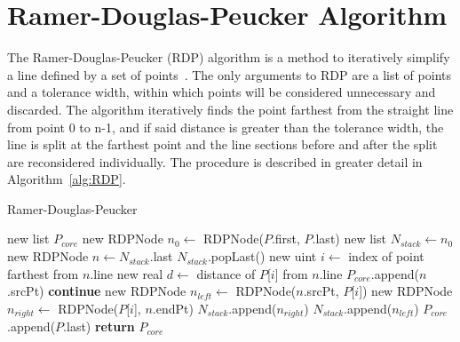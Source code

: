 \section{Ramer-Douglas-Peucker Algorithm}
The Ramer-Douglas-Peucker (RDP) algorithm is a method to iteratively simplify a line defined by a set of points~\cite{RDP_line_reduction_DP, RDP_line_reduction_R}.
The only arguments to RDP are a list of points and a tolerance width, within which points will be considered unnecessary and discarded.
The algorithm iteratively finds the point farthest from the straight line from point 0 to n-1, and if said distance is greater than the tolerance width, the line is split at the farthest point and the line sections before and after the split are reconsidered individually.
The procedure is described in greater detail in Algorithm~\ref{alg:RDP}.

\begin{algorithm}[htb]
\caption{Ramer-Douglas-Peucker}\label{alg:RDP}
\begin{algorithmic}[1]
	\State new list $P_{core}$
	\State new RDPNode $n_0 \leftarrow$ RDPNode($P$.first, $P$.last)
	\State new list $N_{stack} \leftarrow n_0$
		\State new RDPNode $n \leftarrow N_{stack}$.last
		\State $N_{stack}$.popLast()
		\State new uint $i \leftarrow$ index of point farthest from $n$.line
		\State new real $d \leftarrow$ distance of $P$[$i$] from $n$.line
		 
			\State $P_{core}$.append($n$.srcPt) 
			\State \textbf{continue}
		\EndIf
		\State new RDPNode $n_{left} \leftarrow$ RDPNode($n$.srcPt, $P$[$i$])
		\State new RDPNode $n_{right} \leftarrow$ RDPNode($P$[$i$], $n$.endPt)
		\State $N_{stack}$.append($n_{right}$)
		\State $N_{stack}$.append($n_{left}$)
	\EndWhile
	\State $P_{core}$.append($P$.last)
	\State \textbf{return} $P_{core}$
\EndFunction
\end{algorithmic}
\end{algorithm}

